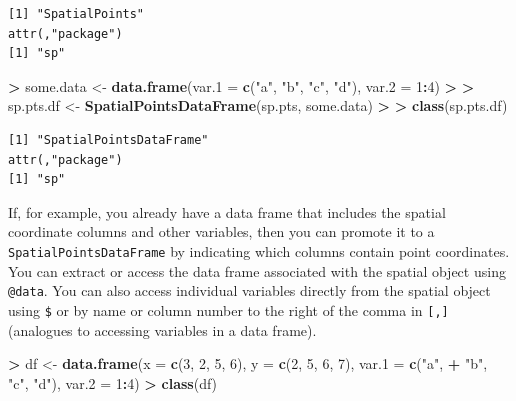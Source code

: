 \documentclass[]{krantz}
\makeatletter
\newenvironment{Shaded}{\begin{snugshade}}{\end{snugshade}}
\newcommand{\KeywordTok}[1]{\textcolor[rgb]{0.27,0.27,0.27}{\textbf{#1}}}
\newcommand{\DataTypeTok}[1]{\textcolor[rgb]{0.27,0.27,0.27}{#1}}
\newcommand{\DecValTok}[1]{\textcolor[rgb]{0.06,0.06,0.06}{#1}}
\newcommand{\StringTok}[1]{\textcolor[rgb]{0.5,0.5,0.5}{#1}}
\newcommand{\OperatorTok}[1]{\textcolor[rgb]{0.43,0.43,0.43}{\textbf{#1}}}
\newcommand{\ErrorTok}[1]{\textcolor[rgb]{0.14,0.14,0.14}{\textbf{#1}}}
\newcommand{\NormalTok}[1]{#1}
\newenvironment{kframe}{%
\medskip{}
\setlength{\fboxsep}{.8em}
 \def\at@end@of@kframe{}%
 \ifinner\ifhmode%
  \def\at@end@of@kframe{\end{minipage}}%
  \begin{minipage}{\columnwidth}%
 \fi\fi%
 \def\FrameCommand##1{\hskip\@totalleftmargin \hskip-\fboxsep
 \colorbox{shadecolor}{##1}\hskip-\fboxsep
     \hskip-\linewidth \hskip-\@totalleftmargin \hskip\columnwidth}%
 \MakeFramed {\advance\hsize-\width
   \@totalleftmargin\z@ \linewidth\hsize
   \@setminipage}}%
 {\par\unskip\endMakeFramed%
 \at@end@of@kframe}
\renewenvironment{Shaded}{\begin{kframe}}{\end{kframe}}
\theoremstyle{definition}
\theoremstyle{definition}
\theoremstyle{definition}
\theoremstyle{remark}
\makeatother
\begin{document}
\begin{verbatim}
[1] "SpatialPoints"
attr(,"package")
[1] "sp"
\end{verbatim}

\begin{Shaded}
\begin{Highlighting}[]
\OperatorTok{>}\StringTok{ }\NormalTok{some.data <-}\StringTok{ }\KeywordTok{data.frame}\NormalTok{(}\DataTypeTok{var.1 =} \KeywordTok{c}\NormalTok{(}\StringTok{"a"}\NormalTok{, }\StringTok{"b"}\NormalTok{, }\StringTok{"c"}\NormalTok{, }\StringTok{"d"}\NormalTok{), }\DataTypeTok{var.2 =} \DecValTok{1}\OperatorTok{:}\DecValTok{4}\NormalTok{)}
\OperatorTok{>}\StringTok{ }
\ErrorTok{>}\StringTok{ }\NormalTok{sp.pts.df <-}\StringTok{ }\KeywordTok{SpatialPointsDataFrame}\NormalTok{(sp.pts, some.data)}
\OperatorTok{>}\StringTok{ }
\ErrorTok{>}\StringTok{ }\KeywordTok{class}\NormalTok{(sp.pts.df)}
\end{Highlighting}
\end{Shaded}

\begin{verbatim}
[1] "SpatialPointsDataFrame"
attr(,"package")
[1] "sp"
\end{verbatim}

If, for example, you already have a data frame that includes the spatial
coordinate columns and other variables, then you can promote it to a
\texttt{SpatialPointsDataFrame} by indicating which columns contain
point coordinates. You can extract or access the data frame associated
with the spatial object using \texttt{@data}. You can also access
individual variables directly from the spatial object using \texttt{\$}
or by name or column number to the right of the comma in
\texttt{{[},{]}} (analogues to accessing variables in a data frame).

\begin{Shaded}
\begin{Highlighting}[]
\OperatorTok{>}\StringTok{ }\NormalTok{df <-}\StringTok{ }\KeywordTok{data.frame}\NormalTok{(}\DataTypeTok{x =} \KeywordTok{c}\NormalTok{(}\DecValTok{3}\NormalTok{, }\DecValTok{2}\NormalTok{, }\DecValTok{5}\NormalTok{, }\DecValTok{6}\NormalTok{), }\DataTypeTok{y =} \KeywordTok{c}\NormalTok{(}\DecValTok{2}\NormalTok{, }\DecValTok{5}\NormalTok{, }\DecValTok{6}\NormalTok{, }\DecValTok{7}\NormalTok{), }\DataTypeTok{var.1 =} \KeywordTok{c}\NormalTok{(}\StringTok{"a"}\NormalTok{, }
\OperatorTok{+}\StringTok{   "b"}\NormalTok{, }\StringTok{"c"}\NormalTok{, }\StringTok{"d"}\NormalTok{), }\DataTypeTok{var.2 =} \DecValTok{1}\OperatorTok{:}\DecValTok{4}\NormalTok{)}
\OperatorTok{>}\StringTok{ }\KeywordTok{class}\NormalTok{(df)}
\end{Highlighting}
\end{Shaded}
\end{document}
